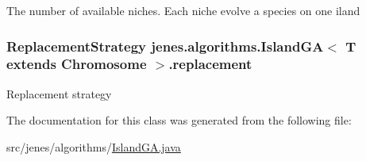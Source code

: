 The number of available niches. Each niche evolve a species on one iland \hypertarget{classjenes_1_1algorithms_1_1_island_g_a_3_01_t_01extends_01_chromosome_01_4_ab3796d8a249ad849e429bf8b996fb720}{
\subsubsection[{replacement}]{\setlength{\rightskip}{0pt plus 5cm}Replacement\-Strategy jenes.\-algorithms.\-Island\-G\-A$<$ T extends Chromosome $>$.replacement\hspace{0.3cm}{\ttfamily [private]}}}\label{classjenes_1_1algorithms_1_1_island_g_a_3_01_t_01extends_01_chromosome_01_4_ab3796d8a249ad849e429bf8b996fb720}
Replacement strategy 

The documentation for this class was generated from the following file\-:\begin{DoxyCompactItemize}
\item 
src/jenes/algorithms/\hyperlink{_island_g_a_8java}{Island\-G\-A.\-java}\end{DoxyCompactItemize}
